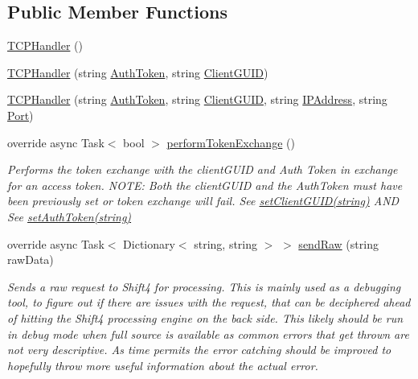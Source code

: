 \subsection*{Public Member Functions}
\begin{DoxyCompactItemize}
\item 
\mbox{\hyperlink{class_form_sim_1_1_t_c_p_handler_a26bcae2698f4403e85fbf24f3020eefb}{T\+C\+P\+Handler}} ()
\item 
\mbox{\hyperlink{class_form_sim_1_1_t_c_p_handler_a385ce1e4fcea1834b3f5b3ffae3f8b3c}{T\+C\+P\+Handler}} (string \mbox{\hyperlink{class_form_sim_1_1_generic_handler_a6699d8bfc9cd305baf30ab9413b21605}{Auth\+Token}}, string \mbox{\hyperlink{class_form_sim_1_1_generic_handler_ae1d2175b140f4c600d74bbab1e22714e}{Client\+G\+U\+ID}})
\item 
\mbox{\hyperlink{class_form_sim_1_1_t_c_p_handler_a40ec089c6d52e24b939e30127c9faeba}{T\+C\+P\+Handler}} (string \mbox{\hyperlink{class_form_sim_1_1_generic_handler_a6699d8bfc9cd305baf30ab9413b21605}{Auth\+Token}}, string \mbox{\hyperlink{class_form_sim_1_1_generic_handler_ae1d2175b140f4c600d74bbab1e22714e}{Client\+G\+U\+ID}}, string \mbox{\hyperlink{class_form_sim_1_1_generic_handler_a12b51dea082a4d40d86829802adf073b}{I\+P\+Address}}, string \mbox{\hyperlink{class_form_sim_1_1_generic_handler_ac6492bb3e4fbe8f66c97b00bd27020c1}{Port}})
\item 
override async Task$<$ bool $>$ \mbox{\hyperlink{class_form_sim_1_1_t_c_p_handler_a61075c8a24b97ae7c86d357d6ee5a49e}{perform\+Token\+Exchange}} ()
\begin{DoxyCompactList}\small\item\em Performs the token exchange with the client\+G\+U\+ID and Auth Token in exchange for an access token. N\+O\+TE\+: Both the client\+G\+U\+ID and the Auth\+Token must have been previously set or token exchange will fail. See \mbox{\hyperlink{interface_form_sim_1_1_f_r_c___handler_a3c77b2e99c98553928e463a9cbb5f7d4}{set\+Client\+G\+U\+I\+D(string)}} A\+ND See \mbox{\hyperlink{interface_form_sim_1_1_f_r_c___handler_a1314ea0937067435e3326818baa9d0c1}{set\+Auth\+Token(string)}} \end{DoxyCompactList}\item 
override async Task$<$ Dictionary$<$ string, string $>$ $>$ \mbox{\hyperlink{class_form_sim_1_1_t_c_p_handler_a810309bc6e943b6ff12ebed8401613f0}{send\+Raw}} (string raw\+Data)
\begin{DoxyCompactList}\small\item\em Sends a raw request to Shift4 for processing. This is mainly used as a debugging tool, to figure out if there are issues with the request, that can be deciphered ahead of hitting the Shift4 processing engine on the back side. This likely should be run in debug mode when full source is available as common errors that get thrown are not very descriptive. As time permits the error catching should be improved to hopefully throw more useful information about the actual error. \end{DoxyCompactList}\end{DoxyCompactItemize}
